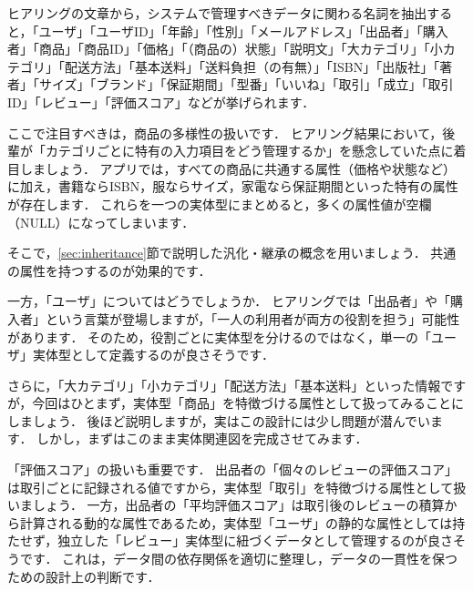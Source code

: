 ヒアリングの文章から，システムで管理すべきデータに関わる名詞を抽出すると，「ユーザ」「ユーザID」「年齢」「性別」「メールアドレス」「出品者」「購入者」「商品」「商品ID」「価格」「（商品の）状態」「説明文」「大カテゴリ」「小カテゴリ」「配送方法」「基本送料」「送料負担（の有無）」「ISBN」「出版社」「著者」「サイズ」「ブランド」「保証期間」「型番」「いいね」「取引」「成立」「取引ID」「レビュー」「評価スコア」などが挙げられます．

ここで注目すべきは，商品の多様性の扱いです．
ヒアリング結果において，後輩が「カテゴリごとに特有の入力項目をどう管理するか」を懸念していた点に着目しましょう．
アプリでは，すべての商品に共通する属性（価格や状態など）に加え，書籍ならISBN，服ならサイズ，家電なら保証期間といった特有の属性が存在します．
これらを一つの実体型にまとめると，多くの属性値が空欄（NULL）になってしまいます．

そこで，\ref{sec:inheritance}節で説明した汎化・継承の概念を用いましょう．
共通の属性を持つするのが効果的です．

一方，「ユーザ」についてはどうでしょうか．
ヒアリングでは「出品者」や「購入者」という言葉が登場しますが，「一人の利用者が両方の役割を担う」可能性があります．
そのため，役割ごとに実体型を分けるのではなく，単一の「ユーザ」実体型として定義するのが良さそうです．

さらに，「大カテゴリ」「小カテゴリ」「配送方法」「基本送料」といった情報ですが，今回はひとまず，実体型「商品」を特徴づける属性として扱ってみることにしましょう．
後ほど説明しますが，実はこの設計には少し問題が潜んでいます．
しかし，まずはこのまま実体関連図を完成させてみます．

「評価スコア」の扱いも重要です．
出品者の「個々のレビューの評価スコア」は取引ごとに記録される値ですから，実体型「取引」を特徴づける属性として扱いましょう．
一方，出品者の「平均評価スコア」は取引後のレビューの積算から計算される動的な属性であるため，実体型「ユーザ」の静的な属性としては持たせず，独立した「レビュー」実体型に紐づくデータとして管理するのが良さそうです．
これは，データ間の依存関係を適切に整理し，データの一貫性を保つための設計上の判断です．

